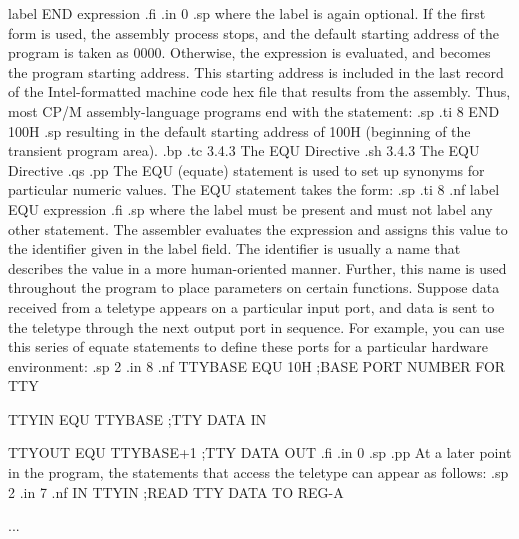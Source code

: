 label END expression
.fi
.in 0
.sp
where the label is again optional.  If the first form is used, 
the assembly process stops, and the default starting address of 
the program is taken as 0000.  Otherwise, the expression is 
evaluated, and becomes the program starting address.  This 
starting address is included in the last record of the Intel-formatted
machine code hex file that results from the 
assembly.  Thus, most CP/M assembly-language programs end with 
the statement:
.sp
.ti 8
END  100H
.sp
resulting in the default starting address of 100H (beginning of 
the transient program area).
.bp
.tc         3.4.3  The EQU Directive
.sh
3.4.3  The EQU Directive
.qs
.pp
The EQU (equate) statement is used to set up synonyms for 
particular numeric values.  The EQU statement takes the form:
.sp
.ti 8
.nf
label    EQU    expression
.fi
.sp
where the label must be present and must not label any other 
statement.  The assembler evaluates the expression and assigns 
this value to the identifier given in the label field.  The 
identifier is usually a name that describes the value in a more 
human-oriented manner.  Further, this name is used throughout the 
program to place parameters on certain functions.  Suppose data 
received from a teletype appears on a particular input port, and 
data is sent to the teletype through the next output port in 
sequence.  For example, you can use this series of equate statements
to define these ports for a particular hardware environment:
.sp 2
.in 8
.nf
TTYBASE      EQU 10H         ;BASE PORT NUMBER FOR TTY

TTYIN        EQU TTYBASE     ;TTY DATA IN

TTYOUT       EQU TTYBASE+1   ;TTY DATA OUT
.fi
.in 0
.sp
.pp
At a later point in the program, the statements that access the 
teletype can appear as follows:
.sp 2
.in 7
.nf
 IN     TTYIN     ;READ TTY DATA TO REG-A

 ...

